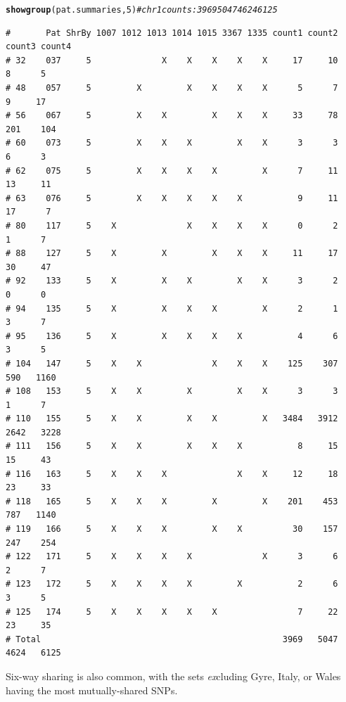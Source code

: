 \documentclass{article}\usepackage[]{graphicx}\usepackage[]{color}
\makeatletter
\newcommand{\hlnum}[1]{\textcolor[rgb]{0.686,0.059,0.569}{#1}}%
\newcommand{\hlcom}[1]{\textcolor[rgb]{0.678,0.584,0.686}{\textit{#1}}}%
\newcommand{\hlstd}[1]{\textcolor[rgb]{0.345,0.345,0.345}{#1}}%
\newcommand{\hlkwd}[1]{\textcolor[rgb]{0.737,0.353,0.396}{\textbf{#1}}}%
\newenvironment{kframe}{%
 \def\at@end@of@kframe{}%
 \ifinner\ifhmode%
  \def\at@end@of@kframe{\end{minipage}}%
  \begin{minipage}{\columnwidth}%
 \fi\fi%
 \def\FrameCommand##1{\hskip\@totalleftmargin \hskip-\fboxsep
 \colorbox{shadecolor}{##1}\hskip-\fboxsep
     \hskip-\linewidth \hskip-\@totalleftmargin \hskip\columnwidth}%
 \MakeFramed {\advance\hsize-\width
   \@totalleftmargin\z@ \linewidth\hsize
   \@setminipage}}%
 {\par\unskip\endMakeFramed%
 \at@end@of@kframe}
\newenvironment{knitrout}{}{} %
\makeatother
\begin{document}
\begin{knitrout}\footnotesize
{}\color{fgcolor}\begin{kframe}
\begin{alltt}
\hlkwd{showgroup}\hlstd{(pat.summaries,}\hlnum{5}\hlstd{)} \hlcom{# chr 1 counts: 3969   5047   4624  6125}
\end{alltt}
\begin{verbatim}
#       Pat ShrBy 1007 1012 1013 1014 1015 3367 1335 count1 count2 count3 count4
# 32    037     5              X    X    X    X    X     17     10      8      5
# 48    057     5         X         X    X    X    X      5      7      9     17
# 56    067     5         X    X         X    X    X     33     78    201    104
# 60    073     5         X    X    X         X    X      3      3      6      3
# 62    075     5         X    X    X    X         X      7     11     13     11
# 63    076     5         X    X    X    X    X           9     11     17      7
# 80    117     5    X              X    X    X    X      0      2      1      7
# 88    127     5    X         X         X    X    X     11     17     30     47
# 92    133     5    X         X    X         X    X      3      2      0      0
# 94    135     5    X         X    X    X         X      2      1      3      7
# 95    136     5    X         X    X    X    X           4      6      3      5
# 104   147     5    X    X              X    X    X    125    307    590   1160
# 108   153     5    X    X         X         X    X      3      3      1      7
# 110   155     5    X    X         X    X         X   3484   3912   2642   3228
# 111   156     5    X    X         X    X    X           8     15     15     43
# 116   163     5    X    X    X              X    X     12     18     23     33
# 118   165     5    X    X    X         X         X    201    453    787   1140
# 119   166     5    X    X    X         X    X          30    157    247    254
# 122   171     5    X    X    X    X              X      3      6      2      7
# 123   172     5    X    X    X    X         X           2      6      3      5
# 125   174     5    X    X    X    X    X                7     22     23     35
# Total                                                3969   5047   4624   6125
\end{verbatim}
\end{kframe}
\end{knitrout}

Six-way sharing is also common, with the sets \emph{ex}cluding Gyre, Italy, or Wales having the most mutually-shared SNPs.
\end{document}
